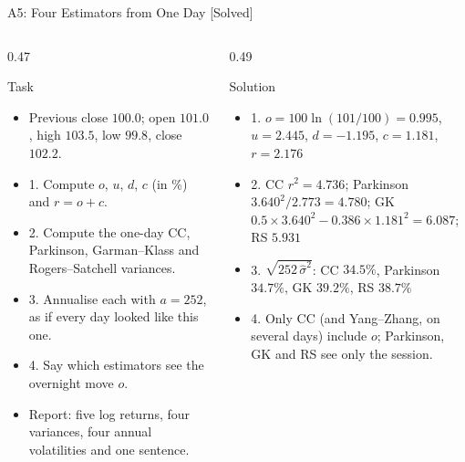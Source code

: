 \begin{frame}{A5: Four Estimators from One Day [Solved]}
\itemsize{\scriptsize}
\begin{columns}[T]
\begin{column}{0.47\textwidth}
\begin{block}{Task}
\begin{itemize}
    \item Previous close $100.0$; open $101.0$, high $103.5$, low $99.8$, close $102.2$.
    \item 1. Compute $o$, $u$, $d$, $c$ (in \%) and $r = o + c$.
    \item 2. Compute the one-day CC, Parkinson, Garman--Klass and Rogers--Satchell variances.
    \item 3. Annualise each with $a = 252$, as if every day looked like this one.
    \item 4. Say which estimators see the overnight move $o$.
    \item Report: five log returns, four variances, four annual volatilities and one sentence.
\end{itemize}
\end{block}
\end{column}
\begin{column}{0.49\textwidth}
\begin{exampleblock}{Solution}
\begin{itemize}
    \item 1. $o = 100\ln(101/100) = 0.995$, $u = 2.445$, $d = -1.195$, $c = 1.181$, $r = 2.176$
    \item 2. CC $r^2 = 4.736$; Parkinson $3.640^2/2.773 = 4.780$; GK $0.5 \times 3.640^2 - 0.386 \times 1.181^2 = 6.087$; RS $5.931$
    \item 3. $\sqrt{252\,\hat\sigma^2}$: CC $34.5\%$, Parkinson $34.7\%$, GK $39.2\%$, RS $38.7\%$
    \item 4. Only CC (and Yang--Zhang, on several days) include $o$; Parkinson, GK and RS see only the session.
\end{itemize}
\end{exampleblock}
\end{column}
\end{columns}
\end{frame}

